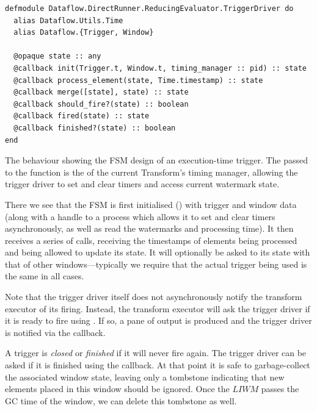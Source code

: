\begin{listing}[h]
	\begin{verbatim}
defmodule Dataflow.DirectRunner.ReducingEvaluator.TriggerDriver do
  alias Dataflow.Utils.Time
  alias Dataflow.{Trigger, Window}
  
  @opaque state :: any
  @callback init(Trigger.t, Window.t, timing_manager :: pid) :: state
  @callback process_element(state, Time.timestamp) :: state
  @callback merge([state], state) :: state
  @callback should_fire?(state) :: boolean
  @callback fired(state) :: state
  @callback finished?(state) :: boolean
end
	\end{verbatim}
\caption[The  behaviour showing the FSM design of an execution-time trigger.]{The  behaviour showing the FSM design of an execution-time trigger. The  passed to the  function is the  of the current Transform's timing manager, allowing the trigger driver to set and clear timers and access current watermark state.}
\label{lst:impl:trigger_driver}
\end{listing}


There we see that the FSM is first initialised () with trigger and window data (along with a handle to a process which allows it to set and clear timers asynchronously, as well as read the watermarks and processing time).
It then receives a series of  calls, receiving the timestamps of elements being processed and being allowed to update its state.
It will optionally be asked to  its state with that of other windows---typically we require that the actual trigger being used is the same in all cases.

Note that the trigger driver itself does not asynchronously notify the transform executor of its firing.
Instead, the transform executor will ask the trigger driver if it is ready to fire using .
If so, a pane of output is produced and the trigger driver is notified via the  callback.

A trigger is \emph{closed} or \emph{finished} if it will never fire again.
The trigger driver can be asked if it is finished using the  callback.
At that point it is safe to garbage-collect the associated window state, leaving only a tombstone indicating that new elements placed in this window should be ignored.
Once the $\mathit{LIWM}$ passes the GC time of the window, we can delete this tombstone as well.

